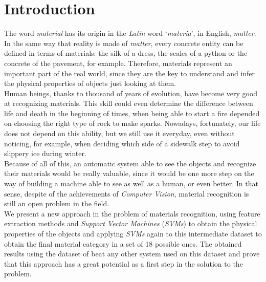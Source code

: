 
\section{Introduction}

The word \emph{material} has its origin in the \emph{Latin} word `\emph{materia}', in English, \emph{matter}. In the same way that reality is made of \emph{matter}, every concrete entity can be defined in terms of materials: the silk of a dress, the scales of a python or the concrete of the pavement, for example. Therefore, materials represent an important part of the real world, since they are the key to understand and infer the physical properties of objects just looking at them. \\

Human beings, thanks to thousand of years of evolution, have become very good at recognizing materials. This skill could even determine the difference between life and death in the beginning of times, when being able to start a fire depended on choosing the right type of rock to make sparks. Nowadays, fortunately, our life does not depend on this ability, but we still use it everyday, even without noticing, for example, when deciding which side of a sidewalk step to avoid slippery ice during winter. \\

Because of all of this, an automatic system able to see the objects and recognize their materials would be really valuable, since it would be one more step on the way of building a machine able to see as well as a human, or even better. In that sense, despite of the achievements of \emph{Computer Vision}, material recognition is still an open problem in the field. \\

We present a new approach in the problem of materials recognition, using feature extraction methods and \emph{Support Vector Machines} (\emph{SVMs}) to obtain the physical properties of the objects and applying \emph{SVMs} again to this intermediate dataset to obtain the final material category in a set of 18 possible ones. The obtained results using the dataset of \cite{Liao_2013_CVPR} beat any other system used on this dataset and prove that this approach has a great potential as a first step in the solution to the problem.